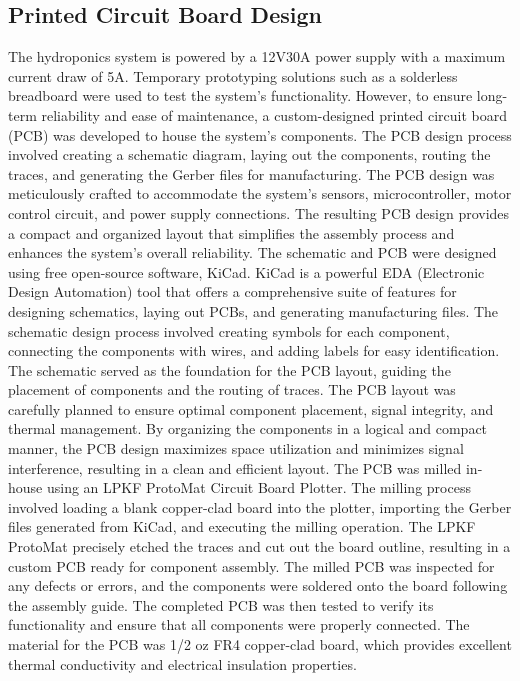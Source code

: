 \documentclass[12pt]{article} %
\begin{document}
\subsection{Printed Circuit Board Design}
\noindent The hydroponics system is powered by a 12V30A power supply with a maximum current draw of 5A. Temporary prototyping solutions such as a solderless breadboard were used to test the system's functionality. However, to ensure long-term reliability and ease of maintenance, a custom-designed printed circuit board (PCB) was developed to house the system's components. The PCB design process involved creating a schematic diagram, laying out the components, routing the traces, and generating the Gerber files for manufacturing. The PCB design was meticulously crafted to accommodate the system's sensors, microcontroller, motor control circuit, and power supply connections. The resulting PCB design provides a compact and organized layout that simplifies the assembly process and enhances the system's overall reliability.
\newline
\newline
\noindent The schematic and PCB were designed using free open-source software, KiCad. KiCad is a powerful EDA (Electronic Design Automation) tool that offers a comprehensive suite of features for designing schematics, laying out PCBs, and generating manufacturing files. The schematic design process involved creating symbols for each component, connecting the components with wires, and adding labels for easy identification. The schematic served as the foundation for the PCB layout, guiding the placement of components and the routing of traces. The PCB layout was carefully planned to ensure optimal component placement, signal integrity, and thermal management. By organizing the components in a logical and compact manner, the PCB design maximizes space utilization and minimizes signal interference, resulting in a clean and efficient layout.
\newline
\newline
\noindent The PCB was milled in-house using an LPKF ProtoMat Circuit Board Plotter. The milling process involved loading a blank copper-clad board into the plotter, importing the Gerber files generated from KiCad, and executing the milling operation. The LPKF ProtoMat precisely etched the traces and cut out the board outline, resulting in a custom PCB ready for component assembly. The milled PCB was inspected for any defects or errors, and the components were soldered onto the board following the assembly guide. The completed PCB was then tested to verify its functionality and ensure that all components were properly connected. The material for the PCB was 1/2 oz FR4 copper-clad board, which provides excellent thermal conductivity and electrical insulation properties.
\end{document}

